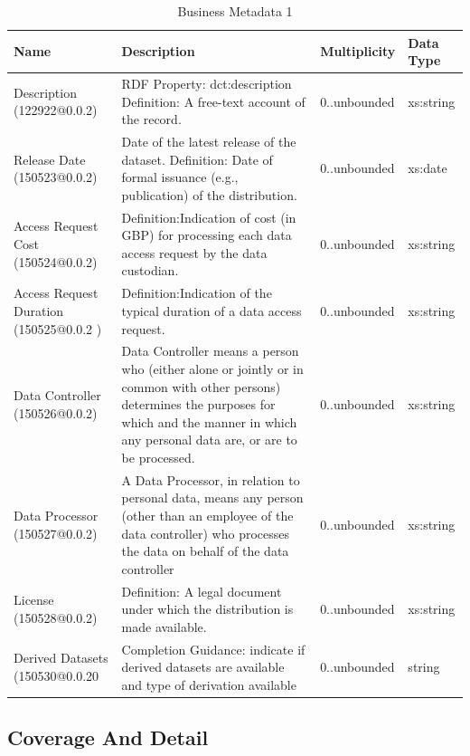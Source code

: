 \documentclass{article}
\begin{document}
\begin{table}[h]
	\begin{center}
		\caption{Business Metadata 1}
		\label{tab:business}
		\begin{tabular}{ p{3cm} | p{5cm} | p{2cm} | p{1cm}  } 
			\textbf{Name} &	\textbf{Description	}& \textbf{Multiplicity} &\textbf{Data Type }\\
			\hline
			Description (122922@0.0.2)	& RDF Property:	dct:description
			Definition:	A free-text account of the record.
			 & 0..unbounded & 	xs:string
			\\
			\hline
			Release Date (150523@0.0.2) &	Date of the latest release of the dataset. 
			Definition: Date of formal issuance (e.g., publication) of the distribution.	& 0..unbounded	& xs:date
			 \\
			 \hline
			 Access Request Cost (150524@0.0.2) & Definition:Indication of cost (in GBP) for processing each data access request by the data custodian.
			 & 0..unbounded	& xs:string
			 \\
			 \hline
			 Access Request Duration (150525@0.0.2 )	& Definition:Indication of the typical duration of a data access request.	& 0..unbounded &	xs:string
			 \\
			 \hline
			 Data Controller (150526@0.0.2)	& Data Controller means a person who (either alone or jointly or in common with other persons) determines the purposes for which and the manner in which any personal data are, or are to be processed.
			 &	0..unbounded & xs:string
			 \\
			 \hline
			 Data Processor (150527@0.0.2) &	A Data Processor, in relation to personal data, means any person (other than an employee of the data controller) who processes the data on behalf of the data controller
			 &	0..unbounded &	xs:string
			 \\
			 \hline
			 License (150528@0.0.2) & Definition: A legal document under which the distribution is made available.
			 & 0..unbounded	& xs:string
			 \\
			 \hline
			 Derived Datasets (150530@0.0.20 & Completion Guidance: indicate if derived datasets are available and type of derivation available
			 &	0..unbounded &	string
			 \\
		\end{tabular}
	\end{center}
\end{table}
\FloatBarrier
	
\newpage
\subsection{Coverage And Detail}
\end{document}
